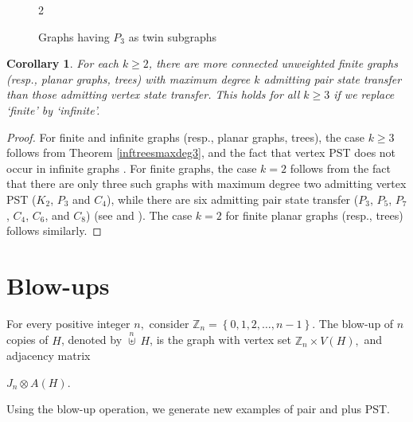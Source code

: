 \documentclass[12pt,a4paper]{article}
\newtheorem{cor}{Corollary}
\newcommand{\cb}[1]{\left\lbrace #1\right\rbrace}
\begin{document}
\begin{figure}
\begin{multicols}{2}
\begin{center}
			\end{center}
\end{multicols}
\caption{\label{figg} Graphs having $P_3$ as twin subgraphs}
\end{figure}

\begin{cor}
\label{more}
For each $k\geq 2$, there are more connected unweighted finite graphs (resp., planar graphs, trees) with maximum degree $k$ admitting pair state transfer than those admitting vertex state transfer. This holds for all $k\geq 3$ if we replace `finite' by `infinite'.
\end{cor}

\begin{proof}
For finite and infinite graphs (resp., planar graphs, trees), the case $k\geq 3$ follows from Theorem \ref{inftreesmaxdeg3}, \cite[Corollary 6.2]{god2} and the fact that vertex PST does not occur in infinite graphs \cite[Theorem 5.6]{godd}. For finite graphs, the case $k=2$ follows from the fact that there are only three such graphs with maximum degree two admitting vertex PST ($K_2$, $P_3$ and $C_4$), while there are six admitting pair state transfer ($P_3$, $P_5$, $P_7$, $C_4$, $C_6$, and $C_8$) (see \cite[Corollary 7.4]{godsil2025perfect} and \cite[Theorem 6.5]{kim}). %
The case $k=2$ for finite planar graphs (resp., trees) follows similarly.
\end{proof}


\section{Blow-ups}\label{sec:blow}

For every positive integer $n,$ consider $\mathbb{Z}_n=\cb{0, 1, 2, \ldots, n-1}.$ The blow-up of $n$ copies of $H$, denoted by $\overset{n}{\uplus}~H$, is the graph with vertex set $\mathbb{Z}_n\times V(H),$ and adjacency matrix
\begin{center}
$J_n\otimes A(H).$
\end{center}
Using the blow-up operation, we generate new examples of pair and plus PST.
    
\end{document}
